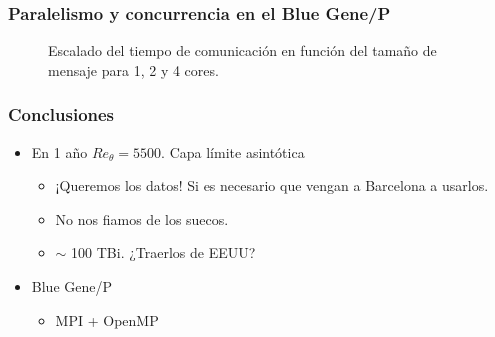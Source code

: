 \documentclass{beamer}
\begin{document}
\begin{frame}
\frametitle{Paralelismo y concurrencia en el Blue Gene/P}
\begin{figure}
\label{fig:qtoctave-secciones}
  \centering
  \caption{Escalado del tiempo de comunicación en función del tamaño de mensaje
    para 1, 2 y 4 cores.}
\end{figure}

\end{frame}


\begin{frame}
\frametitle{Conclusiones}
\begin{itemize}
\item En 1 año $Re_\theta = 5500$. Capa límite asintótica
\begin{itemize}
\item ¡Queremos los datos! Si es necesario que vengan a Barcelona a
  usarlos.
\item No nos fiamos de los suecos.
\item $\sim$ 100 TBi.  ¿Traerlos de EEUU?
\end{itemize}
\item Blue Gene/P
\begin{itemize}
\item MPI + OpenMP
\end{itemize}
\end{itemize}
\end{frame}
\end{document}
